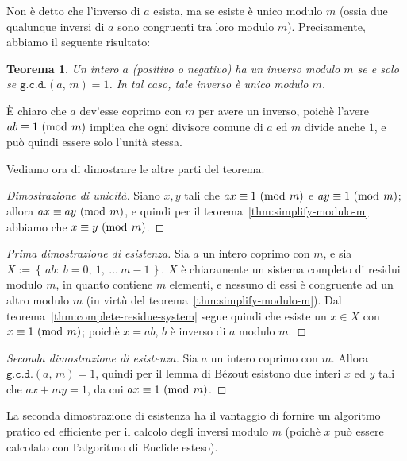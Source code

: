 \documentclass[pdflatex,11pt,a4paper,oneside]{article}
\newcommand{\congruent}[0]{\equiv}
\newcommand{\mmodop}[0]{\ensuremath{\operatorname{mod}}}
\newcommand{\mmod}[1]{\ensuremath{\allowbreak\ (\mmodop\:{#1})}}
\newcommand{\set}[1]{\ensuremath{\left\{\,{#1}\,\right\}}}
\newcommand{\setdef}[2]{\set{{#1}:\:{#2}}}
\newcommand{\gcdop}[0]{\ensuremath{\mathtt{g.c.d.}}}
\newcommand{\xgcd}[1]{\ensuremath{\gcdop\left({#1}\right)}}
\renewcommand{\gcd}[2]{\xgcd{{#1},\,{#2}}}
\newtheorem{theorem}[TheoremLike]{Teorema}
\begin{document}
Non \`e detto che l'inverso di $a$ esista, ma se esiste \`e unico modulo $m$
(ossia due qualunque inversi di $a$ sono congruenti tra loro modulo $m$).
Precisamente, abbiamo il seguente risultato:

\begin{theorem}
Un intero $a$ (positivo o negativo) ha un inverso modulo $m$ se e solo se
$\gcd{a}{m} = 1$.  In tal caso, tale inverso \`e unico modulo $m$.
\end{theorem}

\`E chiaro che $a$ dev'esse coprimo con $m$ per avere un inverso, poich\`e
l'avere $ab \congruent 1 \mmod m$ implica che ogni divisore comune di $a$
ed $m$ divide anche $1$, e pu\`o quindi essere solo l'unit\`a stessa.

\medskip\noindent
Vediamo ora di dimostrare le altre parti del teorema.

\begin{proof}[Dimostrazione di unicit\`a]
Siano $x, y$ tali che $ax \congruent 1 \mmod m$ e $ay \congruent 1
\mmod m$; allora $ax \congruent ay \mmod m$, e quindi per il
teorema~\eqref{thm:simplify-modulo-m} abbiamo che $x \congruent y
\mmod m$.
\end{proof}

\begin{proof}[Prima dimostrazione di esistenza]
Sia $a$ un intero coprimo con $m$, e sia $X := \setdef{ab}{b = 0,\: 1,\:
\ldots\: m - 1}$. $X$ \`e chiaramente un sistema completo di residui modulo
$m$, in quanto contiene $m$ elementi, e nessuno di essi \`e congruente ad
un altro modulo $m$ (in virt\`u del teorema~\eqref{thm:simplify-modulo-m}).
Dal teorema~\eqref{thm:complete-residue-system} segue quindi che esiste un
$x \in X$ con $x \congruent 1 \mmod m$; poich\`e $x = ab$, $b$ \`e inverso
di $a$ modulo $m$.
\end{proof}

\begin{proof}[Seconda dimostrazione di esistenza]
Sia $a$ un intero coprimo con $m$.  Allora $\gcd{a}{m} = 1$, quindi per il
lemma di B\'ezout esistono due interi $x$ ed $y$ tali che $ax + my = 1$,
da cui $ax \congruent 1 \mmod m$.
\end{proof}

La seconda dimostrazione di esistenza ha il vantaggio di fornire un
algoritmo pratico ed efficiente per il calcolo degli inversi modulo $m$
(poich\`e $x$ pu\`o essere calcolato con l'algoritmo di Euclide esteso).

\end{document}
